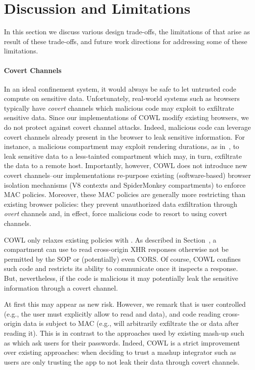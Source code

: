 \section{Discussion and Limitations}
\label{sec:discussion}

In this section we discuss various design trade-offs, the limitations
of \sys{} that arise as result of these trade-offs, and future work
directions for addressing some of these limitations.


\paragraph{Covert Channels}
In an ideal confinement system, it would always be safe to let untrusted
code compute on sensitive data.
%
Unfortunately, real-world systems such as browsers typically have
\emph{covert} channels which malicious code may exploit to exfiltrate
sensitive data.
%
Since our implementations of COWL modify existing browsers, we do not
protect against covert channel attacks.
%
Indeed, malicious code can leverage covert channels already present in
the browser to leak sensitive information.
%
For instance, a malicious compartment may exploit rendering durations,
as in~\tocite{}, to leak sensitive data to a less-tainted compartment
which may, in turn, exfiltrate the data to a remote host.
%
Importantly, however, COWL does not introduce new covert channels--our
implementations re-purpose existing (software-based) browser isolation
mechanisms (V8 contexts and SpiderMonkey compartments) to enforce MAC
policies.
%
Moreover, these MAC policies are generally more restricting than
existing browser policies: they prevent unauthorized data exfiltration
through \emph{overt} channels and, in effect, force malicious code to
resort to using covert channels.


COWL only relaxes existing policies with \lcors.
%
As described in Section~\toref{}, a compartment can use \lcors{} to
read cross-origin XHR responses otherwise not be permitted by the SOP
or (potentially) even CORS.
%
Of course, COWL confines such code and restricts its ability to
communicate once it inspects a response.
%
But, nevertheless, if the code is malicious it may potentially leak the
sensitive information through a covert channel.
 
At first this may appear as new risk.
%
However, we remark that \lcors{} is user controlled (e.g., the user
must explicitly allow  to read  and
 data), and code reading cross-origin data is
subject to MAC (e.g.,  will arbitrarily exfiltrate
the  or  data after reading it).
%
This is in contrast to the approaches used by existing mash-up such as
 which ask users for their passwords.
%
Indeed, COWL is a strict improvement over existing approaches: when
deciding to trust a mashup integrator such as  users
are only trusting the app to not leak their data through covert
channels.

